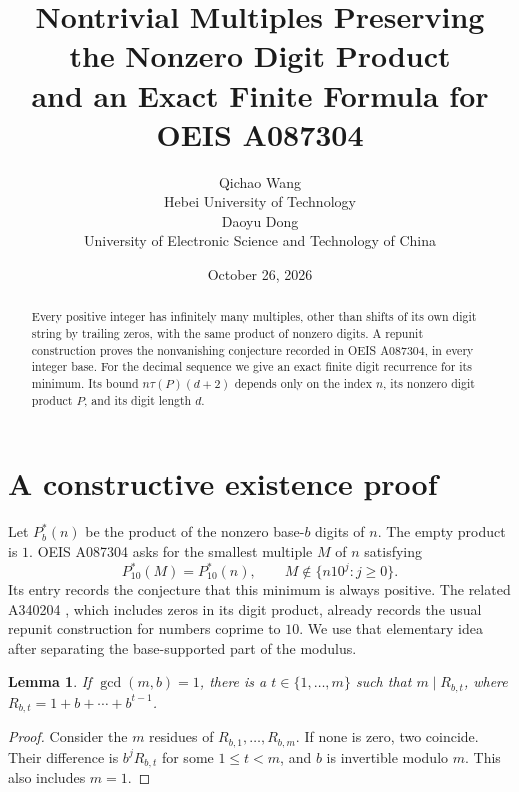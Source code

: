 \documentclass[10pt]{article}
\title{Nontrivial Multiples Preserving the Nonzero Digit Product\\and an Exact Finite Formula for OEIS A087304}
\author{Qichao Wang\\{\small Hebei University of Technology}\\[0.3em]
Daoyu Dong\\{\small University of Electronic Science and Technology of China}}
\date{October 26, 2026}
\newtheorem{lemma}{Lemma}
\newcommand{\Pz}{P^{\!*}}
\begin{document}
\maketitle
\begin{abstract}
Every positive integer has infinitely many multiples, other than shifts
of its own digit string by trailing zeros, with the same product of
nonzero digits. A repunit construction proves the nonvanishing conjecture
recorded in OEIS A087304, in every integer base. For the decimal sequence
we give an exact finite digit recurrence for its minimum. Its bound
$n\tau(P)(d+2)$ depends only on the index $n$, its nonzero digit product
$P$, and its digit length $d$.
\end{abstract}

\section{A constructive existence proof}
Let $\Pz_b(n)$ be the product of the nonzero base-$b$ digits of $n$.
The empty product is $1$. OEIS A087304 \cite{oeis} asks for the smallest
multiple $M$ of $n$ satisfying
\[
 \Pz_{10}(M)=\Pz_{10}(n),\qquad
 M\notin\{n10^j:j\ge0\}.
\]
Its entry records the conjecture that this minimum is always positive.
The related A340204 \cite{related}, which includes zeros in its digit
product, already records the usual repunit construction for numbers
coprime to $10$. We use that elementary idea after separating the
base-supported part of the modulus.

\begin{lemma}\label{lem:repunit}
If $\gcd(m,b)=1$, there is a $t\in\{1,\ldots,m\}$ such that
$m\mid R_{b,t}$, where $R_{b,t}=1+b+\cdots+b^{t-1}$.
\end{lemma}
\begin{proof}
Consider the $m$ residues of $R_{b,1},\ldots,R_{b,m}$. If none is zero,
two coincide. Their difference is $b^jR_{b,t}$ for some $1\le t<m$,
and $b$ is invertible modulo $m$. This also includes $m=1$.
\end{proof}
\end{document}
